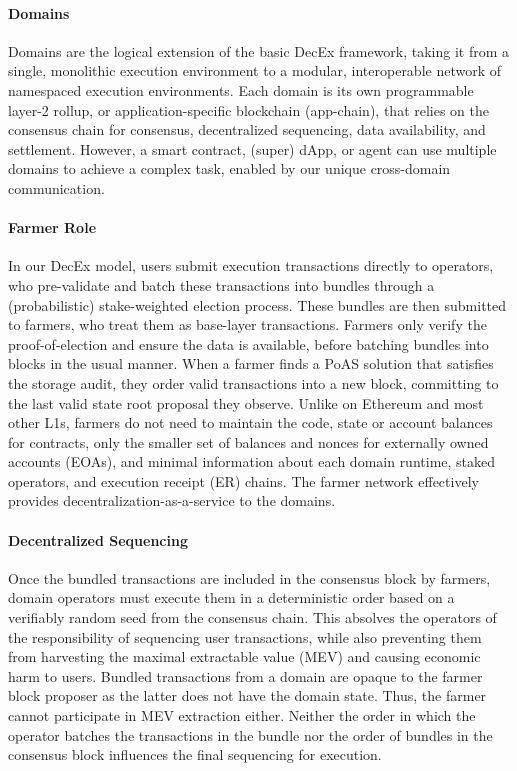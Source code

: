 \documentclass[conference]{IEEEtran}
\begin{document}
\paragraph{Domains}

Domains are the logical extension of the basic DecEx framework, taking it from a single, monolithic execution environment to a modular, interoperable network of namespaced execution environments. Each domain is its own programmable layer-2 rollup, or application-specific blockchain (app-chain), that relies on the consensus chain for consensus, decentralized sequencing, data availability, and settlement. However, a smart contract, (super) dApp, or agent can use multiple domains to achieve a complex task, enabled by our unique cross-domain communication.

\paragraph{Farmer Role}

In our DecEx model, users submit execution transactions directly to operators, who pre-validate and batch these transactions into bundles through a (probabilistic) stake-weighted election process. These bundles are then submitted to farmers, who treat them as base-layer transactions. Farmers only verify the proof-of-election and ensure the data is available, before batching bundles into blocks in the usual manner. When a farmer finds a PoAS solution that satisfies the storage audit, they order valid transactions into a new block, committing to the last valid state root proposal they observe. Unlike on Ethereum and most other L1s, farmers do not need to maintain the code, state or account balances for contracts, only the smaller set of balances and nonces for externally owned accounts (EOAs), and minimal information about each domain runtime, staked operators, and execution receipt (ER) chains. The farmer network effectively provides decentralization-as-a-service to the domains.

\paragraph{Decentralized Sequencing}

Once the bundled transactions are included in the consensus block by farmers, domain operators must execute them in a deterministic order based on a verifiably random seed from the consensus chain. This absolves the operators of the responsibility of sequencing user transactions, while also preventing them from harvesting the maximal extractable value (MEV) and causing economic harm to users. Bundled transactions from a domain are opaque to the farmer block proposer as the latter does not have the domain state. Thus, the farmer cannot participate in MEV extraction either. Neither the order in which the operator batches the transactions in the bundle nor the order of bundles in the consensus block influences the final sequencing for execution.
\end{document}
